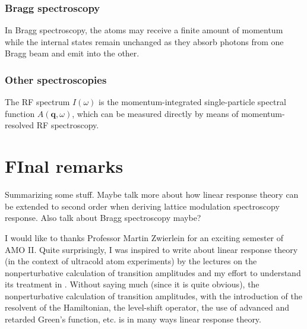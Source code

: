\documentclass[reprint,
nofootinbib,
amsmath,amssymb,
aps]{revtex4-1}
\begin{document}
\subsubsection{Bragg spectroscopy}
\label{sec:Bragg}

In Bragg spectroscopy, the atoms may receive a finite amount of momentum while the internal states remain unchanged as they absorb photons from one Bragg beam and emit into the other. 


\subsubsection{Other spectroscopies}

The RF spectrum $I(\omega)$ is the momentum-integrated single-particle spectral function $A(\mathbf{q}, \omega)$, which can be measured directly by means of momentum-resolved RF spectroscopy. 


\section{FInal remarks}

Summarizing some stuff. Maybe talk more about how linear response theory can be extended to second order when deriving lattice modulation spectroscopy response. Also talk about Bragg spectroscopy maybe? 


\begin{acknowledgments}
	I would like to thanks Professor Martin Zwierlein for an exciting semester of AMO II. Quite surprisingly, I was inspired to write about linear response theory (in the context of ultracold atom experiments) by the lectures on the nonperturbative calculation of transition amplitudes and my effort to understand its treatment in \cite{cohen1998atom}. Without saying much (since it is quite obvious), the nonperturbative calculation of transition amplitudes, with the introduction of the resolvent of the Hamiltonian, the level-shift operator, the use of advanced and retarded Green's function, etc. is in many ways linear response theory. 
\end{acknowledgments}



 
\end{document}
